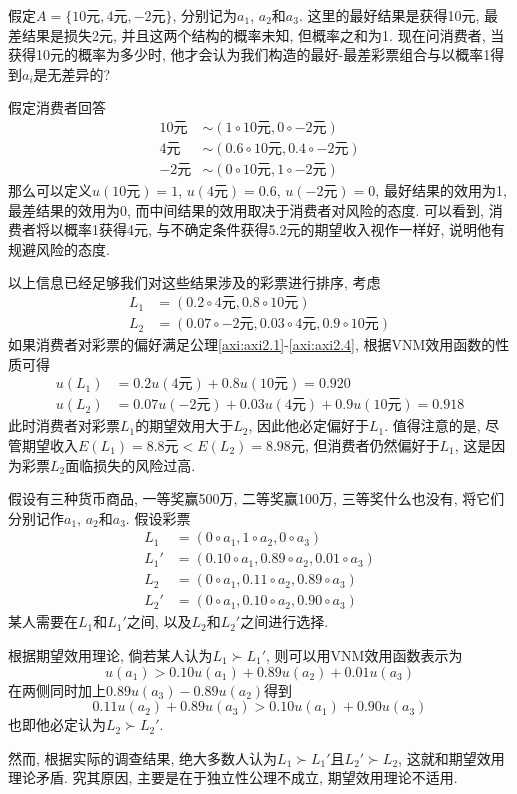 \documentclass[cn, 12pt, math=mtpro2, bibstyle=apa, blue]{elegantbook}
\begin{document}
\begin{example}\label{exp:exp2.1}
假定$A=\{10\text{元},4\text{元},-2\text{元}\}$, 分别记为$a_1$, $a_2$和$a_3$. 这里的最好结果是获得10元, 最差结果是损失2元, 并且这两个结构的概率未知, 但概率之和为1. 现在问消费者, 当获得10元的概率为多少时, 他才会认为我们构造的最好-最差彩票组合与以概率1得到$a_i$是无差异的?

假定消费者回答
\begin{align*}
10\text{元}&\sim (1\circ 10\text{元}, 0\circ -2\text{元}) \\
4\text{元}&\sim (0.6\circ 10\text{元}, 0.4\circ -2\text{元}) \\
-2\text{元}&\sim (0\circ 10\text{元}, 1\circ -2\text{元})
\end{align*}
那么可以定义$u(10\text{元})=1$, $u(4\text{元})=0.6$, $u(-2\text{元})=0$, 最好结果的效用为1, 最差结果的效用为0, 而中间结果的效用取决于消费者对风险的态度. 可以看到, 消费者将以概率1获得4元, 与不确定条件获得5.2元的期望收入视作一样好, 说明他有规避风险的态度.

以上信息已经足够我们对这些结果涉及的彩票进行排序, 考虑
\begin{align*}
L_1&=(0.2\circ 4\text{元}, 0.8\circ 10\text{元}) \\
L_2&=(0.07\circ -2\text{元}, 0.03\circ 4\text{元}, 0.9\circ 10\text{元})
\end{align*}
如果消费者对彩票的偏好满足公理\ref{axi:axi2.1}-\ref{axi:axi2.4}, 根据VNM效用函数的性质可得
\begin{align*}
u(L_1)&=0.2u(4\text{元})+0.8u(10\text{元})=0.920 \\
u(L_2)&=0.07u(-2\text{元})+0.03u(4\text{元})+0.9u(10\text{元})=0.918
\end{align*}
此时消费者对彩票$L_1$的期望效用大于$L_2$, 因此他必定偏好于$L_1$. 值得注意的是, 尽管期望收入$E(L_1)=8.8\text{元}<E(L_2)=8.98\text{元}$, 但消费者仍然偏好于$L_1$, 这是因为彩票$L_2$面临损失的风险过高.
\end{example}

\begin{example}[$\,$Allais悖论]
假设有三种货币商品, 一等奖赢500万, 二等奖赢100万, 三等奖什么也没有, 将它们分别记作$a_1$, $a_2$和$a_3$. 假设彩票
\begin{align*}
L_1&=(0\circ a_1, 1\circ a_2, 0\circ a_3) \\
L_1'&=(0.10\circ a_1,0.89\circ a_2, 0.01\circ a_3) \\
L_2&=(0\circ a_1, 0.11\circ a_2, 0.89\circ a_3) \\
L_2'&=(0\circ a_1, 0.10\circ a_2, 0.90\circ a_3)
\end{align*}
某人需要在$L_1$和$L_1'$之间, 以及$L_2$和$L_2'$之间进行选择. 

根据期望效用理论, 倘若某人认为$L_1\succ L_1'$, 则可以用VNM效用函数表示为
$$u(a_1)>0.10u(a_1)+0.89u(a_2)+0.01u(a_3)$$
在两侧同时加上$0.89u(a_3)-0.89u(a_2)$得到
$$0.11u(a_2)+0.89u(a_3)>0.10u(a_1)+0.90u(a_3)$$
也即他必定认为$L_2\succ L_2'$. 

然而, 根据实际的调查结果, 绝大多数人认为$L_1\succ L_1'$且$L_2'\succ L_2$, 这就和期望效用理论矛盾. 究其原因, 主要是在于独立性公理不成立, 期望效用理论不适用.

\end{example}
\end{document}
